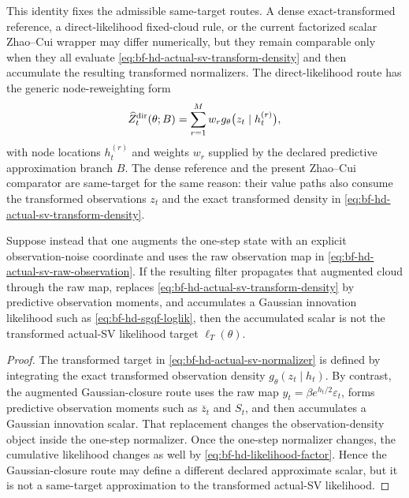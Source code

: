 This identity fixes the admissible same-target routes.  A dense exact-transformed
reference, a direct-likelihood fixed-cloud rule, or the current factorized
scalar Zhao--Cui wrapper may differ numerically, but they remain comparable only
when they all evaluate \eqref{eq:bf-hd-actual-sv-transform-density} and then
accumulate the resulting transformed normalizers.  The direct-likelihood route
has the generic node-reweighting form
\begin{equation}
  \widehat Z_t^{\rm dir}(\theta;B)
  =
  \sum_{r=1}^M
  w_r
g_\theta\bigl(z_t\mid h_t^{(r)}\bigr),
  \label{eq:bf-hd-actual-sv-direct-normalizer}
\end{equation}
with node locations \(h_t^{(r)}\) and weights \(w_r\) supplied by the declared
predictive approximation branch \(B\).  The dense reference and the present
Zhao--Cui comparator are same-target for the same reason: their value paths also
consume the transformed observations \(z_t\) and the exact transformed density
in \eqref{eq:bf-hd-actual-sv-transform-density}.

\begin{proposition}
\label{prop:bf-hd-actual-sv-gc-wrong-target}
Suppose instead that one augments the one-step state with an explicit
observation-noise coordinate and uses the raw observation map in
\eqref{eq:bf-hd-actual-sv-raw-observation}.  If the resulting filter propagates
that augmented cloud through the raw map, replaces
\eqref{eq:bf-hd-actual-sv-transform-density} by predictive observation moments,
and accumulates a Gaussian innovation likelihood such as
\eqref{eq:bf-hd-sgqf-loglik}, then the accumulated scalar is not the transformed
actual-SV likelihood target \(\ell_T(\theta)\).
\end{proposition}

\begin{proof}
The transformed target in \eqref{eq:bf-hd-actual-sv-normalizer} is defined by
integrating the exact transformed observation density
\(g_\theta(z_t\mid h_t)\).  By contrast, the augmented Gaussian-closure route
uses the raw map \(y_t=\beta e^{h_t/2}\varepsilon_t\), forms predictive
observation moments such as \(\bar z_t\) and \(S_t\), and then accumulates a
Gaussian innovation scalar.  That replacement changes the observation-density
object inside the one-step normalizer.  Once the one-step normalizer changes, the
cumulative likelihood changes as well by \eqref{eq:bf-hd-likelihood-factor}.
Hence the Gaussian-closure route may define a different declared approximate
scalar, but it is not a same-target approximation to the transformed actual-SV
likelihood.
\end{proof}

